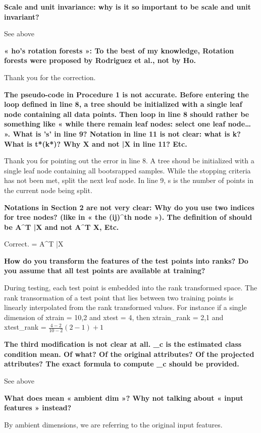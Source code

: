 \textbf{Scale and unit invariance: why is it so important to be scale and unit invariant?}

See above

\textbf{« ho’s rotation forests »: To the best of my knowledge, Rotation forests were proposed by Rodriguez et al., not by Ho.}

Thank you for the correction.

\textbf{The pseudo-code in Procedure 1 is not accurate. Before entering the loop defined in line 8, a tree should be initialized with a single leaf node containing all data points. Then loop in line 8 should rather be something like « while there remain leaf nodes: select one leaf node… ». What is ’s’ in line 9? Notation in line 11 is not clear: what is k? What is t*(k*)? Why X and not \bar{X} in line 11? Etc.}

Thank you for pointing out the error in line 8. A tree shoud be initialized with a single leaf node containing all bootsrapped samples. While the stopping criteria has not been met, split the next leaf node. In line 9, s is the number of points in the current node being split.

\textbf{Notations in Section 2 are not very clear: Why do you use two indices for tree nodes? (like in « the (ij)^th node »). The definition of  should be A^T \bar{X} and not A^T X, Etc.}

Correct.  = A^T \bar{X}

\textbf{How do you transform the features of the test points into ranks? Do you assume that all test points are available at training?}

During testing, each test point is embedded into the rank transformed space. The rank transormation of a test point that lies between two training points is linearly interpolated from the rank transformed values. For instance if a single dimension of xtrain = {10,2} and xtest = 4, then xtrain_rank = {2,1} and xtest_rank = $\frac{4-2}{10-2} (2-1) + 1$

\textbf{The third modification is not clear at all. \hat{\mu}_c is the estimated class condition mean. Of what? Of the original attributes? Of the projected attributes? The exact formula to compute \hat{\mu}_c should be provided.}

See above

\textbf{What does mean « ambient dim »? Why not talking about « input features » instead?}

By ambient dimensions, we are referring to the original input features. 

